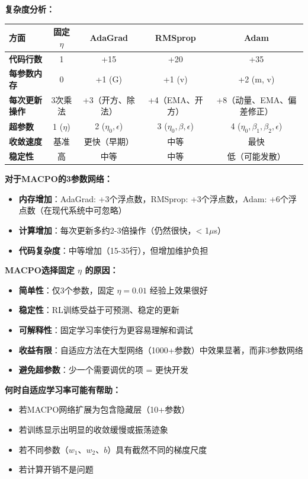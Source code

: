 \documentclass[11pt,a3paper]{ctexart}
\begin{document}
\textbf{复杂度分析：}

\begin{center}
\begin{tabular}{|l|c|c|c|c|}
\hline
\textbf{方面} & \textbf{固定 $\eta$} & \textbf{AdaGrad} & \textbf{RMSprop} & \textbf{Adam} \\
\hline
\textbf{代码行数} & 1 & +15 & +20 & +35 \\
\hline
\textbf{每参数内存} & 0 & +1 (G) & +1 (v) & +2 (m, v) \\
\hline
\textbf{每次更新操作} & 3次乘法 & +3（开方、除法） & +4（EMA、开方） & +8（动量、EMA、偏差修正） \\
\hline
\textbf{超参数} & 1 ($\eta$) & 2 ($\eta_0, \epsilon$) & 3 ($\eta_0, \beta, \epsilon$) & 4 ($\eta_0, \beta_1, \beta_2, \epsilon$) \\
\hline
\textbf{收敛速度} & 基准 & 更快（早期） & 中等 & 最快 \\
\hline
\textbf{稳定性} & 高 & 中等 & 中等 & 低（可能发散） \\
\hline
\end{tabular}
\end{center}

\textbf{对于MACPO的3参数网络：}
\begin{itemize}
    \item \textbf{内存增加}：AdaGrad: +3个浮点数，RMSprop: +3个浮点数，Adam: +6个浮点数（在现代系统中可忽略）
    \item \textbf{计算增加}：每次更新多约2-3倍操作（仍然很快，< 1$\mu$s）
    \item \textbf{代码复杂度}：中等增加（15-35行），但增加维护负担
\end{itemize}

\textbf{MACPO选择固定 $\eta$ 的原因：}
\begin{itemize}
    \item \textbf{简单性}：仅3个参数，固定 $\eta = 0.01$ 经验上效果很好
    \item \textbf{稳定性}：RL训练受益于可预测、稳定的更新
    \item \textbf{可解释性}：固定学习率使行为更容易理解和调试
    \item \textbf{收益有限}：自适应方法在大型网络（1000+参数）中效果显著，而非3参数网络
    \item \textbf{避免超参数}：少一个需要调优的项 = 更快开发
\end{itemize}

\textbf{何时自适应学习率可能有帮助：}
\begin{itemize}
    \item 若MACPO网络扩展为包含隐藏层（10+参数）
    \item 若训练显示出明显的收敛缓慢或振荡迹象
    \item 若不同参数（$w_1$、$w_2$、$b$）具有截然不同的梯度尺度
    \item 若计算开销不是问题
\end{itemize}
\end{document}
